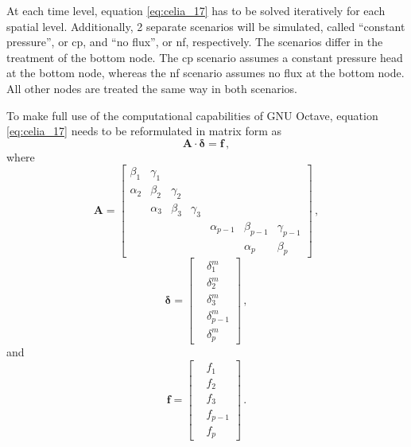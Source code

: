 At each time level, equation \eqref{eq:celia_17} has to be solved iteratively for each spatial level.  Additionally, 2 separate scenarios will be simulated, called ``constant pressure'', or cp,  and ``no flux'', or nf, respectively.  The scenarios differ in the treatment of the bottom node.  The cp scenario assumes a constant pressure head at the bottom node, whereas the nf scenario assumes no flux at the bottom node.  All other nodes are treated the same way in both scenarios.

To make full use of the computational capabilities of GNU Octave, equation \eqref{eq:celia_17} needs to be reformulated in matrix form as \parencite{lier_root_2006}
\begin{equation}
  \label{eq:maform}
  \mathbf{A} \cdot \boldsymbol{\delta} = \mathbf{f} \, ,
\end{equation}
where
\begin{equation}
  \label{eq:mat_A}
  \mathbf{A} = 
  \begin{bmatrix}
    \beta_1 & \gamma_1 & & & & & \\
    \alpha_2 & \beta_2 & \gamma_2 & & & & \\
    & \alpha_3 & \beta_3 & \gamma_3 & & & \\
    & & & & \alpha_{p-1} & \beta_{p-1} & \gamma_{p-1} \\
    & & & & & \alpha_p & \beta_p
  \end{bmatrix} \, ,
\end{equation}
\begin{equation}
  \label{eq:vec_delta}
  \boldsymbol{\delta} = 
  \begin{bmatrix}
    &\delta_1^m \\
    &\delta_2^m \\
    &\delta_3^m \\
    &\delta_{p-1}^m \\
    &\delta_p^m
  \end{bmatrix} \, ,
\end{equation}
and
\begin{equation}
  \label{eq:vec_f}
  \mathbf{f} =
  \begin{bmatrix}
    &f_1 \\
    &f_2 \\
    &f_3 \\
    &f_{p-1} \\
    &f_p
  \end{bmatrix} \, .
\end{equation}


